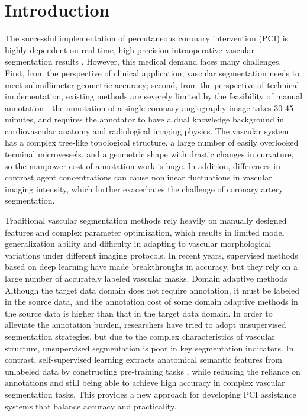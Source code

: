 \section{Introduction}
\label{sec:intro}

The successful implementation of percutaneous coronary intervention (PCI) is highly dependent on real-time, high-precision intraoperative vascular segmentation results \cite{YTL}. However, this medical demand faces many challenges. First, from the perspective of clinical application, vascular segmentation needs to meet submillimeter geometric accuracy; second, from the perspective of technical implementation, existing methods are severely limited by the feasibility of manual annotation - the annotation of a single coronary angiography image takes 30-45 minutes, and requires the annotator to have a dual knowledge background in cardiovascular anatomy and radiological imaging physics. The vascular system has a complex tree-like topological structure, a large number of easily overlooked terminal microvessels, and a geometric shape with drastic changes in curvature, so the manpower cost of annotation work is huge. In addition, differences in contrast agent concentrations can cause nonlinear fluctuations in vascular imaging intensity, which further exacerbates the challenge of coronary artery segmentation.


Traditional vascular segmentation methods \cite{FC.13.YNet}\cite{FC.22.Hessian} rely heavily on manually designed features and complex parameter optimization, which results in limited model generalization ability and difficulty in adapting to vascular morphological variations under different imaging protocols. In recent years, supervised methods based on deep learning \cite{SSVS.8}\cite{SSVS.33}\cite{SSVS.36} have made breakthroughs in accuracy, but they rely on a large number of accurately labeled vascular masks. Domain adaptive methods \cite{SSVS.3}\cite{SSVS.31}\cite{01.00.C-DARL} Although the target data domain does not require annotation, it must be labeled in the source data, and the annotation cost of some domain adaptive methods \cite{00.01.XA-Sim2Real} in the source data is higher than that in the target data domain. In order to alleviate the annotation burden, researchers have tried to adopt unsupervised segmentation \cite{FC.19.IIC}\cite{FC.9.ReDO} strategies, but due to the complex characteristics of vascular structure, unsupervised segmentation is poor in key segmentation indicators. In contrast, 
self-supervised learning extracts anatomical semantic features from unlabeled data by constructing pre-training tasks \cite{01.02.SSVS}\cite{01.01.DARL}\cite{02.01.FreeCOS}, 
while reducing the reliance on annotations and still being able to achieve high accuracy in complex vascular segmentation tasks. 
This provides a new approach for developing PCI assistance systems that balance accuracy and practicality.

